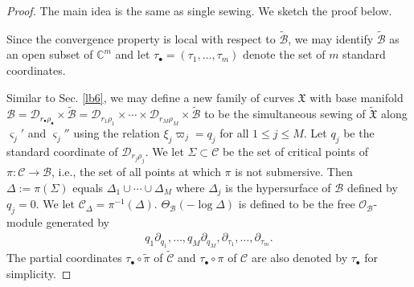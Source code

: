 \documentclass[12pt,a4paper,notitlepage]{article}
\theoremstyle{definition}
\theoremstyle{plain}
\newcommand{\fk}{\mathfrak}
\newcommand{\mc}{\mathcal}
\newcommand{\wtd}{\widetilde}
\newcommand{\scr}{\mathscr}
\newcommand{\sgm}{\varsigma}
\newcommand{\blt}{\bullet}
\newcommand{\Cbb}{\mathbb C}
\numberwithin{equation}{section}
\begin{document}
\begin{proof}
The main idea is the same as single sewing. We sketch the proof below.

Since the convergence property is local with respect to $\wtd{\mc B}$, we may identify $\wtd{\mc B}$ as an open subset of $\Cbb^m$ and let $\tau_\blt=(\tau_1,\dots,\tau_m)$ denote the set of  $m$ standard  coordinates. 



Similar to Sec. \ref{lb6}, we may define a new family of curves $\fk X$ with base manifold $\mc B=\mc D_{r_\blt\rho_\blt}\times\wtd{\mc B}=\mc D_{r_1\rho_1}\times\cdots\times\mc D_{r_M\rho_M}\times\wtd{\mc B}$ to be the simultaneous sewing of $\wtd{\fk X}$ along $\sgm_j'$ and $\sgm_j''$ using the relation $\xi_j\varpi_j=q_j$ for all $1\leq j\leq M$. Let $q_j$ be the standard coordinate of $\mc D_{r_j\rho_j}$. We let $\Sigma\subset\mc C$ be the set of critical points of $\pi:\mc C\rightarrow\mc B$, i.e., the set of all points at which $\pi$ is not submersive. Then $\Delta:=\pi(\Sigma)$ equals $\Delta_1\cup\cdots\cup\Delta_M$ where $\Delta_j$ is the hypersurface of $\mc B$ defined by $q_j=0$. We let $\mc C_\Delta=\pi^{-1}(\Delta)$. $\Theta_{\mc B}(-\log\Delta)$ is defined to be the free $\scr O_{\mc B}$-module generated by
\begin{align*}
	q_1\partial_{q_1},\dots,q_M\partial_{q_M},\partial_{\tau_1},\dots,\partial_{\tau_m}.
\end{align*}
The partial coordinates $\tau_\blt\circ\wtd\pi$ of $\wtd{\mc C}$ and $\tau_\blt\circ\pi$ of $\mc C$ are also denoted by $\tau_\blt$ for simplicity.


\end{proof}
\end{document}
